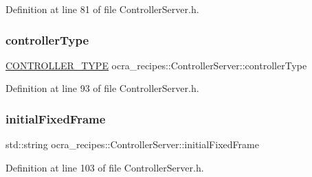 Definition at line 81 of file Controller\+Server.\+h.

\hypertarget{classocra__recipes_1_1ControllerServer_aaf53114a96960a3cb81577378c179411}{}\label{classocra__recipes_1_1ControllerServer_aaf53114a96960a3cb81577378c179411} 
\subsubsection{\texorpdfstring{controller\+Type}{controllerType}}
{\footnotesize\ttfamily \hyperlink{namespaceocra__recipes_ae561cff4ea9a191b8b1ebb4e69a1a4ba}{C\+O\+N\+T\+R\+O\+L\+L\+E\+R\+\_\+\+T\+Y\+PE} ocra\+\_\+recipes\+::\+Controller\+Server\+::controller\+Type\hspace{0.3cm}{\ttfamily [protected]}}



Definition at line 93 of file Controller\+Server.\+h.

\hypertarget{classocra__recipes_1_1ControllerServer_a93ffe0eff924223989db0ae6fcafaca2}{}\label{classocra__recipes_1_1ControllerServer_a93ffe0eff924223989db0ae6fcafaca2} 
\subsubsection{\texorpdfstring{initial\+Fixed\+Frame}{initialFixedFrame}}
{\footnotesize\ttfamily std\+::string ocra\+\_\+recipes\+::\+Controller\+Server\+::initial\+Fixed\+Frame\hspace{0.3cm}{\ttfamily [protected]}}



Definition at line 103 of file Controller\+Server.\+h.

\hypertarget{classocra__recipes_1_1ControllerServer_a46e53b5a5bf9f7d55af477f85cb21522}{}\label{classocra__recipes_1_1ControllerServer_a46e53b5a5bf9f7d55af477f85cb21522} 
